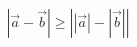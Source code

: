\begin{displaymath}
    \left|\vec{a} - \vec{b}\right| \geq \left| |\vec{a}| - |\vec{b}| \right|
\label{eq:reverse-triangle}
\end{displaymath}
